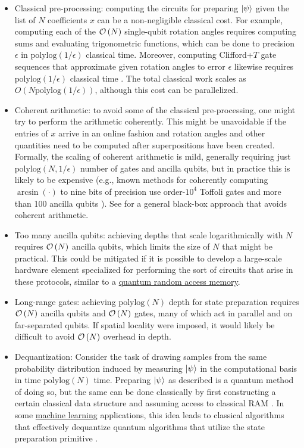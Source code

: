 \begin{refsection}
\begin{itemize}
\item Classical pre-processing: computing the circuits for preparing $\lvert\psi\rangle$ given the list of $N$ coefficients $x$ can be a non-negligible classical cost. For example, computing each of the $\mathcal{O}\left( N \right)$ single-qubit rotation angles requires computing sums and evaluating trigonometric functions, which can be done to precision $\epsilon$ in $\mathrm{polylog}(1/\epsilon)$ classical time. Moreover, computing Clifford+$T$ gate sequences that approximate given rotation angles to error $\epsilon$ likewise requires $\mathrm{polylog}(1/\epsilon)$ classical time \cite{ross2014optimal}. The total classical work scales as $O(N\mathrm{polylog}(1/\epsilon))$, although this cost can be parallelized. 
%
\item Coherent arithmetic: to avoid some of the classical pre-processing, one might try to perform the arithmetic coherently. This might be unavoidable if the entries of $x$ arrive in an online fashion and rotation angles and other quantities need to be computed after superpositions have been created. Formally, the scaling of coherent arithmetic is mild, generally requiring just $\mathrm{polylog}(N,1/\epsilon)$ number of gates and ancilla qubits, but in practice this is likely to be expensive (e.g., known methods for coherently computing $\arcsin(\cdot)$ to nine bits of precision use order-$10^4$ Toffoli gates and more than 100 ancilla qubits \cite{haner2018OptimizingQuantumArithmetic}). See \cite{sanders2019BlackBoxQuantumStatePreparation} for a general black-box approach that avoids coherent arithmetic.
%
\item Too many ancilla qubits: achieving depths that scale logarithmically with $N$ requires $\mathcal{O}\left( N \right)$ ancilla qubits, which limits the size of $N$ that might be practical. This could be mitigated if it is possible to develop a large-scale hardware element specialized for performing the sort of circuits that arise in these protocols, similar to a \hyperref[prim:QRAM]{quantum random access memory}.
%
\item Long-range gates: achieving $\mathrm{polylog}(N)$ depth for state preparation requires $\mathcal{O}\left( N \right)$ ancilla qubits and $\mathcal{O}\left( N \right)$ gates, many of which act in parallel and on far-separated qubits. If spatial locality were imposed, it would likely be difficult to avoid $\mathcal{O}\left( N \right)$ overhead in depth.  

\item Dequantization: Consider the task of drawing samples from the same probability distribution induced by measuring $\lvert\psi\rangle$ in the computational basis in time $\mathrm{polylog}(N)$ time. Preparing $\lvert\psi\rangle$ as described is a quantum method of doing so, but the same can be done classically by first constructing a certain classical data structure and assuming access to classical RAM \cite{chakraborty2018BlockMatrixPowers}. In some \hyperref[appl:ClassicalML]{machine learning} applications, this idea leads to classical algorithms that effectively dequantize quantum algorithms that utilize the state preparation primitive \cite{tang2018QuantumInspiredRecommSys,tang2018QInspiredClassAlgPCA}.  
\end{itemize}


\end{refsection}
